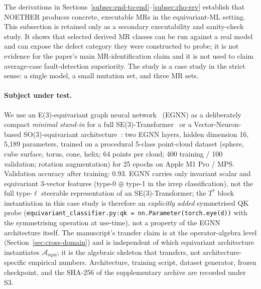 \documentclass[manuscript]{acmart}
\begin{document}
The derivations in Sections~\ref{subsec:end-to-end}--\ref{subsec:rho-rev}
establish that NOETHER produces concrete, executable MRs in the equivariant-ML
setting. This subsection is retained only as a secondary executability and
sanity-check study. It shows that selected derived MR classes can be run against
a real model and can expose the defect category they were constructed to probe;
it is not evidence for the paper's main MR-identification claim and it is not
used to claim average-case fault-detection superiority. The study is a case
study in the strict sense: a single model, a small mutation set, and three MR
sets.

\paragraph{Subject under test.}
We use an E(3)-equivariant graph neural network~\cite{Satorras2021EGNN} (EGNN) as a deliberately compact \emph{minimal stand-in} for a full SE(3)-Transformer~\cite{FuchsTransformer2020} or a Vector-Neuron-based SO(3)-equivariant architecture~\cite{Deng2021VectorNeurons}: two EGNN layers, hidden dimension 16, 5{,}189 parameters, trained on a procedural 5-class point-cloud dataset (sphere, cube surface, torus, cone, helix; 64 points per cloud; 400 training / 100 validation; rotation augmentation) for 25 epochs on Apple M1 Pro / MPS. Validation accuracy after training: 0.93. EGNN carries only invariant scalar and equivariant 3-vector features (type-0 $\oplus$ type-1 in the irrep classification), not the full type-$\ell$ steerable representation of an SE(3)-Transformer; the $T^*$ block instantiation in this case study is therefore an \emph{explicitly added} symmetrised QK probe (\texttt{equivariant\_classifier.py:qk = nn.Parameter(torch.eye(d))} with the symmetrising operation at use-time), not a property of the EGNN architecture itself. The manuscript's transfer claim is at the operator-algebra level (Section~\ref{sec:cross-domain}) and is independent of which equivariant architecture instantiates $\mathcal{A}_{\mathrm{equi}}$; it is the algebraic skeleton that transfers, not architecture-specific empirical numbers. Architecture, training script, dataset generator, frozen checkpoint, and the SHA-256 of the supplementary archive are recorded under S3.
\end{document}
